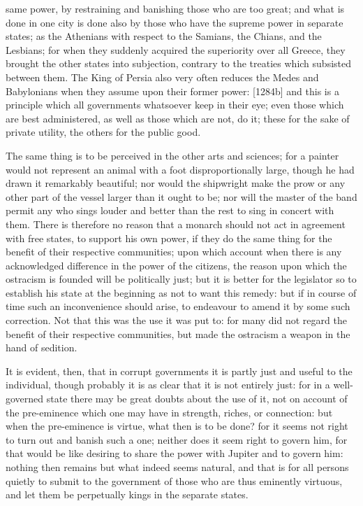 same power, by restraining and banishing those who are too great; and what
is done in one city is done also by those who have the supreme power in
separate states; as the Athenians with respect to the Samians, the Chians,
and the Lesbians; for when they suddenly acquired the superiority over all
Greece, they brought the other states into subjection, contrary to the
treaties which subsisted between them. The King of Persia also very often
reduces the Medes and Babylonians when they assume upon their former
power: [1284b] and this is a principle which all governments whatsoever
keep in their eye; even those which are best administered, as well as
those which are not, do it; these for the sake of private utility, the
others for the public good.

The same thing is to be perceived in the other arts and sciences; for a
painter would not represent an animal with a foot disproportionally large,
though he had drawn it remarkably beautiful; nor would the shipwright make
the prow or any other part of the vessel larger than it ought to be; nor
will the master of the band permit any who sings louder and better than
the rest to sing in concert with them. There is therefore no reason that a
monarch should not act in agreement with free states, to support his own
power, if they do the same thing for the benefit of their respective
communities; upon which account when there is any acknowledged difference
in the power of the citizens, the reason upon which the ostracism is
founded will be politically just; but it is better for the legislator so
to establish his state at the beginning as not to want this remedy: but if
in course of time such an inconvenience should arise, to endeavour to
amend it by some such correction. Not that this was the use it was put to:
for many did not regard the benefit of their respective communities, but
made the ostracism a weapon in the hand of sedition.

It is evident, then, that in corrupt governments it is partly just and
useful to the individual, though probably it is as clear that it is not
entirely just: for in a well-governed state there may be great doubts
about the use of it, not on account of the pre-eminence which one may have
in strength, riches, or connection: but when the pre-eminence is virtue,
what then is to be done? for it seems not right to turn out and banish
such a one; neither does it seem right to govern him, for that would be
like desiring to share the power with Jupiter and to govern him: nothing
then remains but what indeed seems natural, and that is for all persons
quietly to submit to the government of those who are thus eminently
virtuous, and let them be perpetually kings in the separate states.

